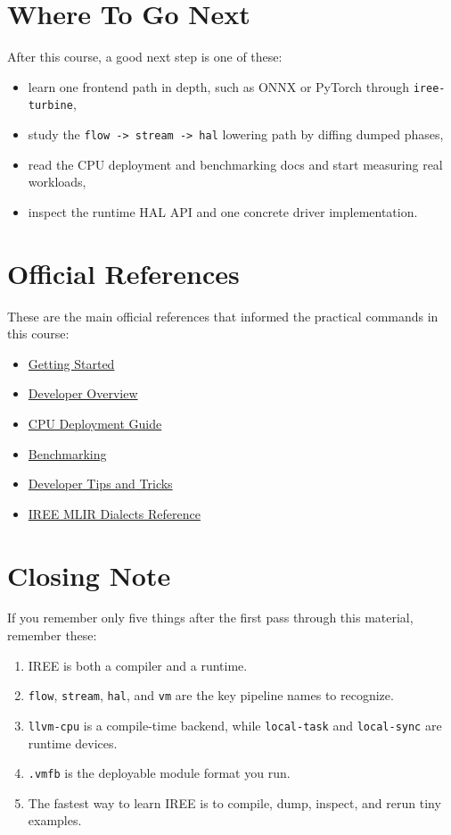 \documentclass[11pt,a4paper]{article}
\begin{document}
\section{Where To Go Next}

After this course, a good next step is one of these:
\begin{itemize}
    \item learn one frontend path in depth, such as ONNX or PyTorch through \texttt{iree-turbine},
    \item study the \texttt{flow -> stream -> hal} lowering path by diffing dumped phases,
    \item read the CPU deployment and benchmarking docs and start measuring real workloads,
    \item inspect the runtime HAL API and one concrete driver implementation.
\end{itemize}

\section{Official References}

These are the main official references that informed the practical commands in this course:

\begin{itemize}
    \item \href{https://iree.dev/building-from-source/getting-started/}{Getting Started}
    \item \href{https://iree.dev/developers/general/developer-overview/}{Developer Overview}
    \item \href{https://iree.dev/guides/deployment-configurations/cpu/}{CPU Deployment Guide}
    \item \href{https://iree.dev/developers/performance/benchmarking/}{Benchmarking}
    \item \href{https://iree.dev/developers/general/developer-tips/}{Developer Tips and Tricks}
    \item \href{https://iree.dev/reference/mlir-dialects/index.html}{IREE MLIR Dialects Reference}
\end{itemize}

\section{Closing Note}

If you remember only five things after the first pass through this material, remember these:
\begin{enumerate}
    \item IREE is both a compiler and a runtime.
    \item \texttt{flow}, \texttt{stream}, \texttt{hal}, and \texttt{vm} are the key pipeline names to recognize.
    \item \texttt{llvm-cpu} is a compile-time backend, while \texttt{local-task} and \texttt{local-sync} are runtime devices.
    \item \texttt{.vmfb} is the deployable module format you run.
    \item The fastest way to learn IREE is to compile, dump, inspect, and rerun tiny examples.
\end{enumerate}
\end{document}

